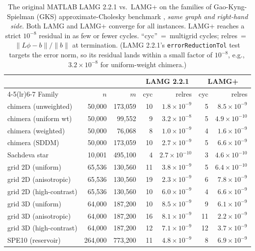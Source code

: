\documentclass{siamart220329}
\begin{document}
\begin{table}[t]\centering
\caption{The original MATLAB LAMG 2.2.1 vs.\ LAMG+ on the families of Gao-Kyng-Spielman (GKS)
approximate-Cholesky benchmark \cite{gks2023}, \emph{same graph and right-hand side}. Both LAMG and LAMG+ converge for all instances. LAMG+ reaches a strict
$10^{-8}$ residual in as few or fewer cycles. ``cyc''~=~multigrid cycles; relres~=~$\|L\phi-b\|/\|b\|$ at
termination. (LAMG 2.2.1's \texttt{errorReductionTol} test targets the error norm, so its residual
lands within a small factor of $10^{-8}$, e.g.,\, $3.2\!\times\!10^{-8}$ for uniform-weight chimera.)}
\label{tab:lamgorig}
\footnotesize\setlength{\tabcolsep}{4pt}%
\begin{tabular}{l r r r r r r}
\toprule
 & & & \multicolumn{2}{c}{LAMG 2.2.1} & \multicolumn{2}{c}{LAMG+}\\
\cmidrule(lr){4-5}\cmidrule(lr){6-7}
Family & $n$ & $m$ & cyc & relres & cyc & relres\\
\midrule
chimera (unweighted) & 50,000 & 173,059 & 10 & $1.8\!\times\!10^{-9}$ & 5 & $8.5\!\times\!10^{-9}$\\
chimera (uniform wt) & 50,000 & 99,552 & 9 & $3.2\!\times\!10^{-8}$ & 5 & $4.9\!\times\!10^{-10}$\\
chimera (weighted) & 50,000 & 76,068 & 8 & $1.0\!\times\!10^{-9}$ & 4 & $1.6\!\times\!10^{-9}$\\
chimera (SDDM) & 50,000 & 173,059 & 10 & $2.7\!\times\!10^{-9}$ & 5 & $6.6\!\times\!10^{-9}$\\
Sachdeva star & 10,001 & 495,100 & 4 & $2.7\!\times\!10^{-10}$ & 3 & $4.6\!\times\!10^{-10}$\\
grid 2D (uniform) & 65,536 & 130,560 & 11 & $3.8\!\times\!10^{-9}$ & 5 & $6.4\!\times\!10^{-10}$\\
grid 2D (anisotropic) & 65,536 & 130,560 & 19 & $2.3\!\times\!10^{-9}$ & 6 & $7.8\!\times\!10^{-9}$\\
grid 2D (high-contrast) & 65,536 & 130,560 & 10 & $6.0\!\times\!10^{-9}$ & 4 & $6.6\!\times\!10^{-9}$\\
grid 3D (uniform) & 64,000 & 187,200 & 10 & $8.5\!\times\!10^{-9}$ & 9 & $6.1\!\times\!10^{-9}$\\
grid 3D (anisotropic) & 64,000 & 187,200 & 16 & $8.1\!\times\!10^{-9}$ & 11 & $2.2\!\times\!10^{-9}$\\
grid 3D (high-contrast) & 64,000 & 187,200 & 12 & $7.1\!\times\!10^{-9}$ & 12 & $3.7\!\times\!10^{-9}$\\
SPE10 (reservoir) & 264,000 & 773,200 & 11 & $4.8\!\times\!10^{-9}$ & 8 & $6.9\!\times\!10^{-9}$\\
\bottomrule
\end{tabular}
\end{table}
\end{document}
